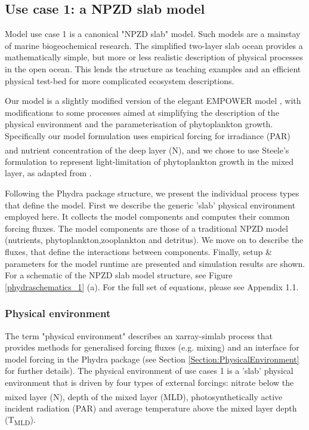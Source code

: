 \documentclass[template.tex]{subfiles}
\begin{document}
\subsection{Use case 1: a NPZD slab model}

Model use case 1 is a canonical "NPZD slab" model. Such models are a mainstay of marine biogeochemical research. The simplified two-layer slab ocean provides a mathematically simple, but more or less realistic description of physical processes in the open ocean. This lends the structure as teaching examples and an efficient physical test-bed for more complicated ecosystem descriptions.

Our model is a slightly modified version of the elegant EMPOWER model \citep{Anderson2015c}, with modifications to some processes aimed at simplifying the description of the physical environment and the parameterisation of phytoplankton growth. 
Specifically our model formulation uses empirical forcing for irradiance (PAR) and nutrient concentration of the deep layer (\unit{N^\emptyset}), and we chose to use Steele's formulation to represent light-limitation of phytoplankton growth in the mixed layer, as adapted from \cite{Acevedo-Trejos2016}. 

Following the Phydra package structure, we present the individual process types that define the model. First we describe the generic 'slab' physical environment employed here. It collects the model components and computes their common forcing fluxes. The model components are those of a traditional NPZD model (nutrients, phytoplankton,zooplankton and detritus). We move on to describe the fluxes, that define the interactions between components. Finally, setup & parameters for the model runtime are presented and simulation results are shown.
For a schematic of the NPZD slab model structure, see Figure \ref{phydraschematics_1} (a). For the full set of equations, please see Appendix 1.1.\\




\subsubsection{Physical environment}

The term "physical environment" describes an xarray-simlab process that provides methods for generalised forcing fluxes (e.g. mixing) and an interface for model forcing in the Phydra package (see Section \ref{Section:PhysicalEnvironment} for further details).
The physical environment of use cases 1 is a 'slab' physical environment that is driven by four types of external forcings: nitrate below the mixed layer (\unit{N^\emptyset}), depth of the mixed layer (MLD), photosynthetically active incident radiation (PAR) and average temperature above the mixed layer depth (\unit{T_{MLD}}).
\end{document}
